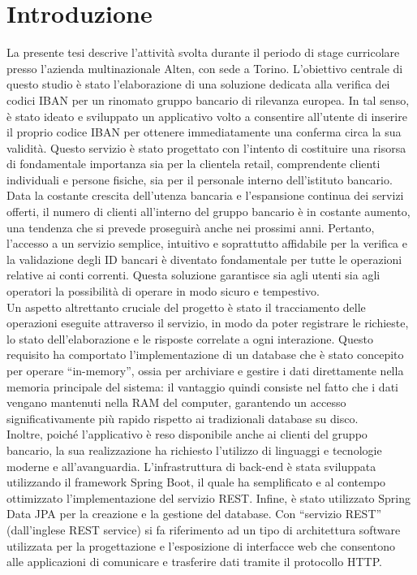 \chapter{Introduzione}
\label{chap:Introduzione}



La presente tesi descrive l'attività svolta durante il periodo di stage curricolare presso l'azienda multinazionale Alten, con sede a Torino. L'obiettivo centrale di questo studio è stato l'elaborazione di una soluzione dedicata alla verifica dei codici IBAN per un rinomato gruppo bancario di rilevanza europea. In tal senso, è stato ideato e sviluppato un applicativo volto a consentire all'utente di inserire il proprio codice IBAN per ottenere immediatamente una conferma circa la sua validità. Questo servizio è stato progettato con l'intento di costituire una risorsa di fondamentale importanza sia per la clientela retail, comprendente clienti individuali e persone fisiche, sia per il personale interno dell'istituto bancario.\\
Data la costante crescita dell'utenza bancaria e l'espansione continua dei servizi offerti, il numero di clienti all'interno del gruppo bancario è in costante aumento, una tendenza che si prevede proseguirà anche nei prossimi anni. Pertanto, l'accesso a un servizio semplice, intuitivo e soprattutto affidabile per la verifica e la validazione degli ID bancari è diventato fondamentale per tutte le operazioni relative ai conti correnti. Questa soluzione garantisce sia agli utenti sia agli operatori la possibilità di operare in modo sicuro e tempestivo.\\
Un aspetto altrettanto cruciale del progetto è stato il tracciamento delle operazioni eseguite attraverso il servizio, in modo da poter registrare le richieste, lo stato dell’elaborazione e le risposte correlate a ogni interazione. Questo requisito ha comportato l'implementazione di un database che è stato concepito per operare “in-memory”, ossia per archiviare e gestire i dati direttamente nella memoria principale del sistema: il vantaggio quindi consiste nel fatto che i dati vengano mantenuti nella RAM del computer, garantendo un accesso significativamente più rapido rispetto ai tradizionali database su disco.\\
Inoltre, poiché l’applicativo è reso disponibile anche ai clienti del gruppo bancario, la sua realizzazione ha richiesto l'utilizzo di linguaggi e tecnologie moderne e all'avanguardia. L'infrastruttura di back-end è stata sviluppata utilizzando il framework Spring Boot, il quale ha semplificato e al contempo ottimizzato l'implementazione del servizio REST. Infine, è stato utilizzato Spring Data JPA per la creazione e la gestione del database. Con “servizio REST” (dall’inglese REST service) si fa riferimento ad un tipo di architettura software utilizzata per la progettazione e l’esposizione di interfacce web che consentono alle applicazioni di comunicare e trasferire dati tramite il protocollo HTTP.\\
